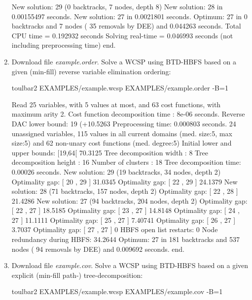 \begin{enumerate}
{\begin{DoxyCode}
New solution: 29 (0 backtracks, 7 nodes, depth 8)
New solution: 28 in 0.00155497 seconds.
New solution: 27 in 0.0021801 seconds.
Optimum: 27 in 0 backtracks and 7 nodes ( 35 removals by DEE) and 0.044263 seconds.
Total CPU time = 0.192932 seconds
Solving real-time = 0.046993 seconds (not including preprocessing time)
end.
\end{DoxyCode}}
\item Download file {\em example.order}. Solve a WCSP using BTD-HBFS based on a given (min-fill) reverse variable elimination ordering:
\begin{DoxyCode}
	toulbar2 EXAMPLES/example.wcsp EXAMPLES/example.order -B=1
\end{DoxyCode}
{\scriptsize
\begin{DoxyCode}
Read 25 variables, with 5 values at most, and 63 cost functions, with maximum arity 2.
Cost function decomposition time : 8e-06 seconds.
Reverse DAC lower bound: 19 (+10.5263%
Preprocessing time: 0.000803 seconds.
24 unassigned variables, 115 values in all current domains (med. size:5, max size:5) and 62 non-unary cost functions (med. degree:5)
Initial lower and upper bounds: [19,64[ 70.3125%
Tree decomposition width  : 8
Tree decomposition height : 16
Number of clusters        : 18
Tree decomposition time: 0.00026 seconds.
New solution: 29 (19 backtracks, 34 nodes, depth 2)
Optimality gap: [ 20 , 29 ] 31.0345 %
Optimality gap: [ 22 , 29 ] 24.1379 %
New solution: 28 (71 backtracks, 157 nodes, depth 2)
Optimality gap: [ 22 , 28 ] 21.4286 %
New solution: 27 (94 backtracks, 204 nodes, depth 2)
Optimality gap: [ 22 , 27 ] 18.5185 %
Optimality gap: [ 23 , 27 ] 14.8148 %
Optimality gap: [ 24 , 27 ] 11.1111 %
Optimality gap: [ 25 , 27 ] 7.40741 %
Optimality gap: [ 26 , 27 ] 3.7037 %
Optimality gap: [ 27 , 27 ] 0 %
HBFS open list restarts: 0 %
Node redundancy during HBFS: 34.2644 %
Optimum: 27 in 181 backtracks and 537 nodes ( 94 removals by DEE) and 0.009692 seconds.
end.
\end{DoxyCode}}
\item Download file {\em example.cov}. Solve a WCSP using BTD-HBFS based on a given explicit (min-fill path-) tree-decomposition:
\begin{DoxyCode}
	toulbar2 EXAMPLES/example.wcsp EXAMPLES/example.cov -B=1
\end{DoxyCode}

\end{enumerate}
